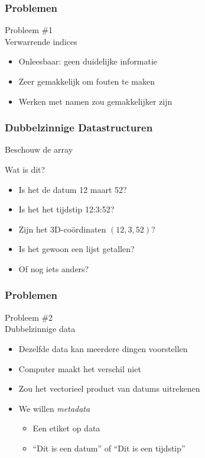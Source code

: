 \begin{frame}
  \frametitle{Problemen}
  \begin{center} 
    {\Huge Probleem \#1} \\[4mm]
    {\Large Verwarrende indices}
  \end{center}
  \begin{itemize}
    \item Onleesbaar: geen duidelijke informatie
    \item Zeer gemakkelijk om fouten te maken
    \item Werken met namen zou gemakkelijker zijn
  \end{itemize}
\end{frame}


\begin{frame}
  \frametitle{Dubbelzinnige Datastructuren}
  Beschouw de array
  \begin{center}
  \end{center}
  Wat is dit?
  \begin{itemize}
    \item Is het de datum 12 maart 52?
    \item Is het het tijdstip 12:3:52?
    \item Zijn het 3D-co\"ordinaten $(12,3,52)$?
    \item Is het gewoon een lijst getallen?
    \item Of nog iets anders?
  \end{itemize}
\end{frame}


\begin{frame}
  \frametitle{Problemen}
  \begin{center} 
    {\Huge Probleem \#2} \\[4mm]
    {\Large Dubbelzinnige data}
  \end{center}
  \begin{itemize}
    \item Dezelfde data kan meerdere dingen voorstellen
    \item Computer maakt het verschil niet
    \item Zou het vectorieel product van datums uitrekenen
    \item We willen \emph{metadata}
          \begin{itemize}
            \item Een etiket op data
            \item ``Dit is een datum'' of ``Dit is een tijdstip''
          \end{itemize}
  \end{itemize}
\end{frame}



